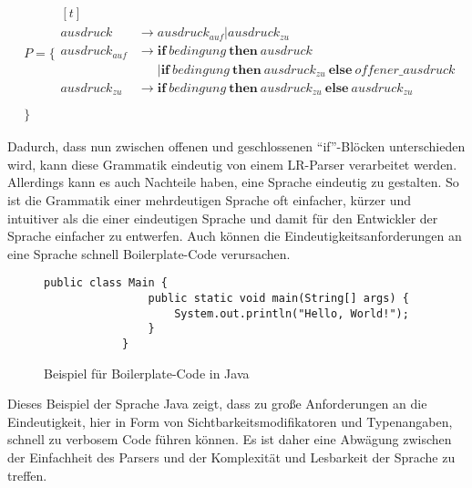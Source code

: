 \documentclass[runningheads]{llncs}
\begin{document}
    \begin{align*}
        & P = \{ \begin{aligned}[t]
                     \\
                     ausdruck & \rightarrow ausdruck_{auf} | ausdruck_{zu} \\
                     ausdruck_{auf} & \rightarrow \textbf{if} \ bedingung \ \textbf{then} \ ausdruck \\
                     \phantom{A} & \phantom{\rightarrow} \vert \textbf{if} \ bedingung \ \textbf{then} \ ausdruck_{zu} \ \textbf{else} \ offener\_ausdruck \\
                     ausdruck_{zu} & \rightarrow \textbf{if} \ bedingung \ \textbf{then} \ ausdruck_{zu} \ \textbf{else} \ ausdruck_{zu} \\
        \end{aligned} \\
        & \}
    \end{align*}

    Dadurch, dass nun zwischen offenen und geschlossenen ``if''-Blöcken unterschieden wird,
    kann diese Grammatik eindeutig von einem LR-Parser verarbeitet werden\cite{abrahams1966association}.
    Allerdings kann es auch Nachteile haben, eine Sprache eindeutig zu gestalten\cite{wharton1976resolution}.
    So ist die Grammatik einer mehrdeutigen Sprache oft einfacher, kürzer und intuitiver als die einer eindeutigen Sprache
    und damit für den Entwickler der Sprache einfacher zu entwerfen.
    Auch können die Eindeutigkeitsanforderungen an eine Sprache schnell Boilerplate-Code verursachen.

    \begin{figure}
        \begin{lstlisting}[style=lstStyle,label={lst:lstlisting3}]
			public class Main {
			    public static void main(String[] args) {
			        System.out.println("Hello, World!");
			    }
			}
        \end{lstlisting}
        \caption{Beispiel für Boilerplate-Code in Java}
        \label{fig:figure4}
    \end{figure}

    Dieses Beispiel der Sprache Java zeigt, dass zu große Anforderungen an die Eindeutigkeit,
    hier in Form von Sichtbarkeitsmodifikatoren und Typenangaben, schnell zu verbosem Code führen können.
    Es ist daher eine Abwägung zwischen der Einfachheit des Parsers und der Komplexität und Lesbarkeit der Sprache zu treffen.
\end{document}
